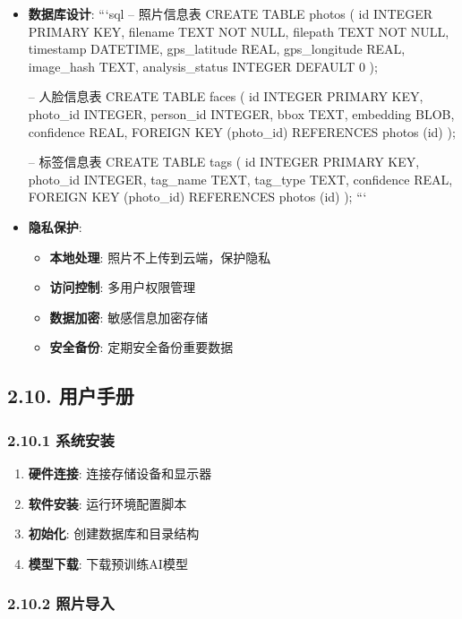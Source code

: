 \begin{itemize}
\item
  \textbf{数据库设计}: ```sql -- 照片信息表 CREATE TABLE photos ( id
  INTEGER PRIMARY KEY, filename TEXT NOT NULL, filepath TEXT NOT NULL,
  timestamp DATETIME, gps\_latitude REAL, gps\_longitude REAL,
  image\_hash TEXT, analysis\_status INTEGER DEFAULT 0 );

  -- 人脸信息表 CREATE TABLE faces ( id INTEGER PRIMARY KEY, photo\_id
  INTEGER, person\_id INTEGER, bbox TEXT, embedding BLOB, confidence
  REAL, FOREIGN KEY (photo\_id) REFERENCES photos (id) );

  -- 标签信息表 CREATE TABLE tags ( id INTEGER PRIMARY KEY, photo\_id
  INTEGER, tag\_name TEXT, tag\_type TEXT, confidence REAL, FOREIGN KEY
  (photo\_id) REFERENCES photos (id) ); ```
\item
  \textbf{隐私保护}:

  \begin{itemize}
  \tightlist
  \item
    \textbf{本地处理}: 照片不上传到云端，保护隐私
  \item
    \textbf{访问控制}: 多用户权限管理
  \item
    \textbf{数据加密}: 敏感信息加密存储
  \item
    \textbf{安全备份}: 定期安全备份重要数据
  \end{itemize}
\end{itemize}

\subsection{2.10. 用户手册}\label{ux7528ux6237ux624bux518c}

\subsubsection{2.10.1 系统安装}\label{ux7cfbux7edfux5b89ux88c5}

\begin{enumerate}
\def\labelenumi{\arabic{enumi}.}
\tightlist
\item
  \textbf{硬件连接}: 连接存储设备和显示器
\item
  \textbf{软件安装}: 运行环境配置脚本
\item
  \textbf{初始化}: 创建数据库和目录结构
\item
  \textbf{模型下载}: 下载预训练AI模型
\end{enumerate}

\subsubsection{2.10.2 照片导入}\label{ux7167ux7247ux5bfcux5165}


